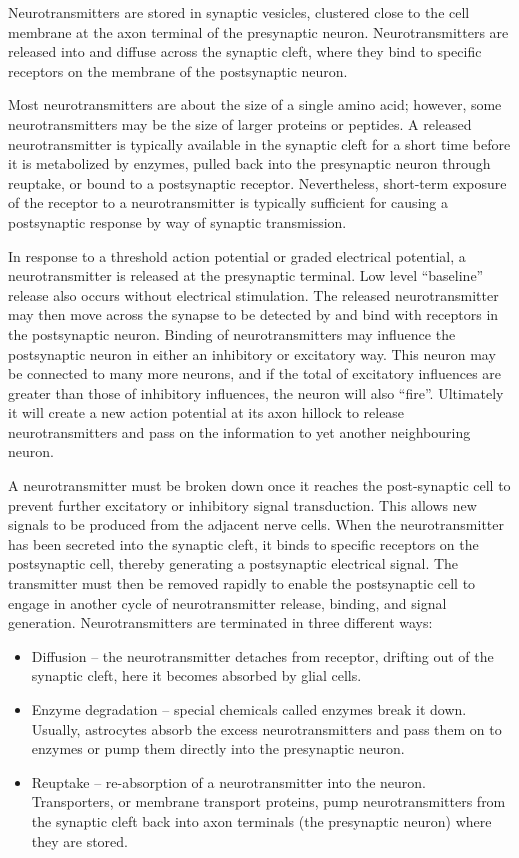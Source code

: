 \documentclass[]{book}
\providecommand{\tightlist}{%
  \setlength{\itemsep}{0pt}\setlength{\parskip}{0pt}}
\begin{document}
Neurotransmitters are stored in synaptic vesicles, clustered close to the cell membrane at the axon terminal of the presynaptic neuron. Neurotransmitters are released into and diffuse across the synaptic cleft, where they bind to specific receptors on the membrane of the postsynaptic neuron.

Most neurotransmitters are about the size of a single amino acid; however, some neurotransmitters may be the size of larger proteins or peptides. A released neurotransmitter is typically available in the synaptic cleft for a short time before it is metabolized by enzymes, pulled back into the presynaptic neuron through reuptake, or bound to a postsynaptic receptor. Nevertheless, short-term exposure of the receptor to a neurotransmitter is typically sufficient for causing a postsynaptic response by way of synaptic transmission.

In response to a threshold action potential or graded electrical potential, a neurotransmitter is released at the presynaptic terminal. Low level ``baseline'' release also occurs without electrical stimulation. The released neurotransmitter may then move across the synapse to be detected by and bind with receptors in the postsynaptic neuron. Binding of neurotransmitters may influence the postsynaptic neuron in either an inhibitory or excitatory way. This neuron may be connected to many more neurons, and if the total of excitatory influences are greater than those of inhibitory influences, the neuron will also ``fire''. Ultimately it will create a new action potential at its axon hillock to release neurotransmitters and pass on the information to yet another neighbouring neuron.

A neurotransmitter must be broken down once it reaches the post-synaptic cell to prevent further excitatory or inhibitory signal transduction. This allows new signals to be produced from the adjacent nerve cells. When the neurotransmitter has been secreted into the synaptic cleft, it binds to specific receptors on the postsynaptic cell, thereby generating a postsynaptic electrical signal. The transmitter must then be removed rapidly to enable the postsynaptic cell to engage in another cycle of neurotransmitter release, binding, and signal generation. Neurotransmitters are terminated in three different ways:

\begin{itemize}
\tightlist
\item
  Diffusion -- the neurotransmitter detaches from receptor, drifting out of the synaptic cleft, here it becomes absorbed by glial cells.
\item
  Enzyme degradation -- special chemicals called enzymes break it down. Usually, astrocytes absorb the excess neurotransmitters and pass them on to enzymes or pump them directly into the presynaptic neuron.
\item
  Reuptake -- re-absorption of a neurotransmitter into the neuron. Transporters, or membrane transport proteins, pump neurotransmitters from the synaptic cleft back into axon terminals (the presynaptic neuron) where they are stored.
\end{itemize}
\end{document}
